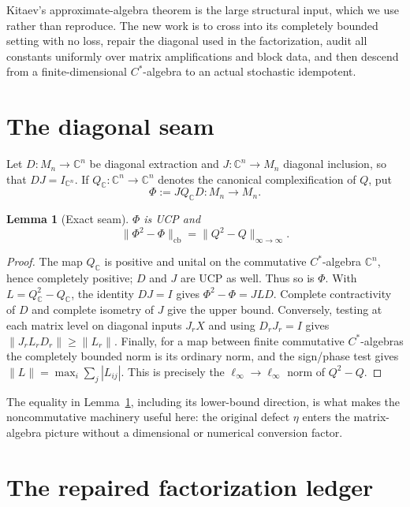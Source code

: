 \documentclass[10pt]{article}
\newtheorem{lemma}[theorem]{Lemma}
\newcommand{\linf}{\ell_\infty}
\newcommand{\cb}{\mathrm{cb}}
\newcommand{\C}{\mathbb C}
\newcommand{\norm}[1]{\lVert #1\rVert}
\begin{document}
Kitaev's approximate-algebra theorem \cite{Kitaev} is the large structural
input, which we use rather than reproduce.  The new work is to cross into its
completely bounded setting with no loss, repair the diagonal used in the
factorization, audit all constants uniformly over matrix amplifications and
block data, and then descend from a finite-dimensional $C^*$-algebra to an
actual stochastic idempotent.

\section{The diagonal seam}

Let $D:M_n\to\C^n$ be diagonal extraction and
$J:\C^n\to M_n$ diagonal inclusion, so that $DJ=I_{\C^n}$.  If
$Q_{\C}:\C^n\to\C^n$ denotes the canonical complexification of $Q$, put
\[
  \Phi:=JQ_{\C}D:M_n\longrightarrow M_n.
\]

\begin{lemma}[Exact seam]\label{lem:seam}
$\Phi$ is UCP and
\[
  \norm{\Phi^2-\Phi}_{\cb}
  =\norm{Q^2-Q}_{\infty\to\infty}.
\]
\end{lemma}

\begin{proof}
The map $Q_{\C}$ is positive and unital on the commutative $C^*$-algebra
$\C^n$, hence completely positive; $D$ and $J$ are UCP as well.  Thus so is
$\Phi$.  With $L=Q_{\C}^2-Q_{\C}$, the identity $DJ=I$ gives
$\Phi^2-\Phi=JLD$.  Complete contractivity of $D$ and complete isometry of
$J$ give the upper bound.  Conversely, testing at each matrix level on
diagonal inputs $J_rX$ and using $D_rJ_r=I$ gives
$\norm{J_rL_rD_r}\geq\norm{L_r}$.  Finally, for a map between finite
commutative $C^*$-algebras the completely bounded norm is its ordinary norm,
and the sign/phase test gives
$\norm{L}=\max_i\sum_j|L_{ij}|$.  This is precisely the
$\linf\!\to\!\linf$ norm of $Q^2-Q$.
\end{proof}

The equality in Lemma~\ref{lem:seam}, including its lower-bound direction,
is what makes the noncommutative machinery useful here: the original defect
$\eta$ enters the matrix-algebra picture without a dimensional or numerical
conversion factor.

\section{The repaired factorization ledger}
\end{document}

